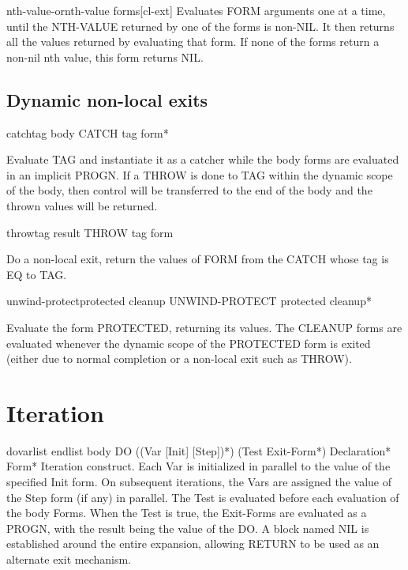 \documentclass[10pt,english]{book}
\begin{document}
\begin{macro}{nth-value-or}{nth-value \body forms}[cl-ext]
  Evaluates FORM arguments one at a time, until the NTH-VALUE returned by one
of the forms is non-NIL. It then returns all the values returned by evaluating
that form. If none of the forms return a non-nil nth value, this form returns
NIL.
\end{macro}

\section{Dynamic non-local exits}
\label{sec:dynamic-non-local}

\begin{specialop}{catch}{tag \body body}
  CATCH tag form*

Evaluate TAG and instantiate it as a catcher while the body forms are
evaluated in an implicit PROGN. If a THROW is done to TAG within the dynamic
scope of the body, then control will be transferred to the end of the body and
the thrown values will be returned.
\end{specialop}

\begin{specialop}{throw}{tag result}
  THROW tag form

Do a non-local exit, return the values of FORM from the CATCH whose tag is EQ
to TAG.
\end{specialop}

\begin{specialop}{unwind-protect}{protected \body cleanup}
  UNWIND-PROTECT protected cleanup*

Evaluate the form PROTECTED, returning its values. The CLEANUP forms are
evaluated whenever the dynamic scope of the PROTECTED form is exited (either
due to normal completion or a non-local exit such as THROW).
\end{specialop}


\chapter{Iteration}
\label{cha:iteration}

\begin{macro}{do}{varlist endlist \body body}
  DO ({(Var [Init] [Step])}*) (Test Exit-Form*) Declaration* Form*
  Iteration construct. Each Var is initialized in parallel to the value of the
  specified Init form. On subsequent iterations, the Vars are assigned the
  value of the Step form (if any) in parallel. The Test is evaluated before
  each evaluation of the body Forms. When the Test is true, the Exit-Forms
  are evaluated as a PROGN, with the result being the value of the DO. A block
  named NIL is established around the entire expansion, allowing RETURN to be
  used as an alternate exit mechanism.
\end{macro}
\end{document}
